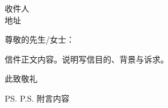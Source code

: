 \documentclass[11pt]{letter}
\date{\today}
\begin{document}
\begin{letter}{收件人 \\ 地址}

\opening{尊敬的先生/女士：}

信件正文内容。说明写信目的、背景与诉求。

\closing{此致敬礼}

\ps{P.S. 附言内容}

\end{letter}
\end{document}
